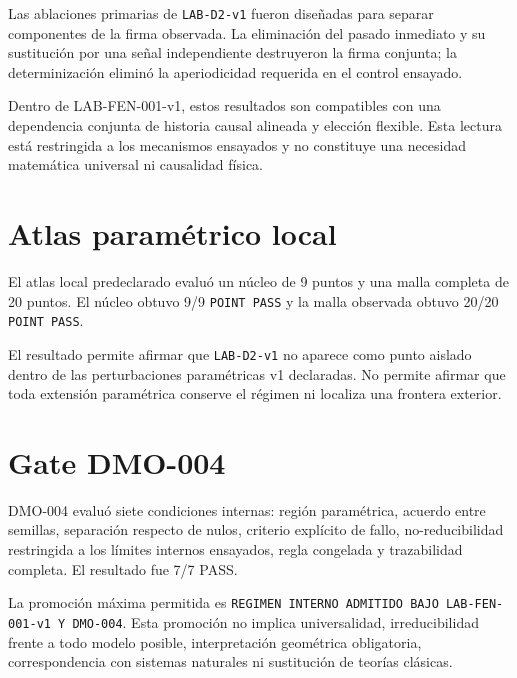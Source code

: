 \begin{observation}
Las ablaciones primarias de \texttt{LAB-D2-v1} fueron diseñadas para separar componentes de la firma observada. La eliminación del pasado inmediato y su sustitución por una señal independiente destruyeron la firma conjunta; la determinización eliminó la aperiodicidad requerida en el control ensayado.
\end{observation}

\begin{observation}
Dentro de LAB-FEN-001-v1, estos resultados son compatibles con una dependencia conjunta de historia causal alineada y elección flexible. Esta lectura está restringida a los mecanismos ensayados y no constituye una necesidad matemática universal ni causalidad física.
\end{observation}

\section*{Atlas paramétrico local}

\begin{observation}
El atlas local predeclarado evaluó un núcleo de 9 puntos y una malla completa de 20 puntos. El núcleo obtuvo 9/9 \texttt{POINT PASS} y la malla observada obtuvo 20/20 \texttt{POINT PASS}.
\end{observation}

\begin{observation}
El resultado permite afirmar que \texttt{LAB-D2-v1} no aparece como punto aislado dentro de las perturbaciones paramétricas v1 declaradas. No permite afirmar que toda extensión paramétrica conserve el régimen ni localiza una frontera exterior.
\end{observation}

\section*{Gate DMO-004}

\begin{observation}
DMO-004 evaluó siete condiciones internas: región paramétrica, acuerdo entre semillas, separación respecto de nulos, criterio explícito de fallo, no-reducibilidad restringida a los límites internos ensayados, regla congelada y trazabilidad completa. El resultado fue 7/7 PASS.
\end{observation}

\begin{observation}
La promoción máxima permitida es \texttt{REGIMEN INTERNO ADMITIDO BAJO LAB-FEN-001-v1 Y DMO-004}. Esta promoción no implica universalidad, irreducibilidad frente a todo modelo posible, interpretación geométrica obligatoria, correspondencia con sistemas naturales ni sustitución de teorías clásicas.
\end{observation}

